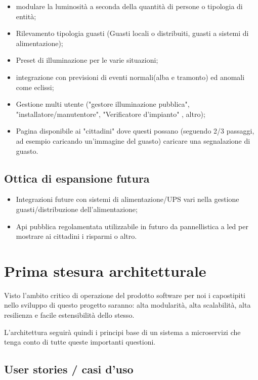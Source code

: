 \begin{itemize}
    \item modulare la luminosità a seconda della quantità di persone o tipologia di entità;
    \item Rilevamento tipologia guasti (Guasti locali o distribuiti, guasti a sistemi di alimentazione);
    \item Preset di illuminazione per le varie situazioni;
    \item integrazione con previsioni di eventi normali(alba e tramonto) ed anomali come eclissi;
    \item Gestione multi utente ("gestore illuminazione pubblica", "installatore/manutentore", "Verificatore d'impianto" , altro);
    \item Pagina disponibile ai "cittadini" dove questi possano (seguendo 2/3 passaggi, ad esempio caricando un'immagine del guasto) caricare una segnalazione di guasto.
\end{itemize}

\subsection{Ottica di espansione futura}

\begin{itemize}
    \item Integrazioni future con sistemi di alimentazione/UPS vari nella gestione guasti/distribuzione dell'alimentazione;
    \item Api pubblica regolamentata utilizzabile in futuro da pannellistica a led per mostrare ai cittadini i risparmi o altro.
\end{itemize}

\section{Prima stesura architetturale}

Visto l'ambito critico di operazione del prodotto software per noi i capostipiti nello sviluppo di questo progetto saranno: alta modularità, alta scalabilità, alta resilienza e facile estensibilità dello stesso.

L'architettura seguirà quindi i principi base di un sistema a microservizi che tenga conto di tutte queste importanti questioni.

\subsection{User stories / casi d'uso}

